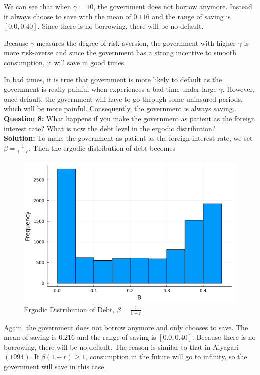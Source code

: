 \documentclass{article}
\begin{document}
	We can see that when $\gamma = 10$, the government does not borrow anymore. Instead it always choose to save with the mean of $0.116$ and the range of saving is $[0.0, 0.40]$. Since there is no borrowing, there will be no default.
	
	Because $\gamma$ measures the degree of risk aversion, the government with higher $\gamma$ is more risk-averse and since the government has a strong incentive to smooth consumption, it will save in good times.
	
	In bad times, it is true that government is more likely to default as the government is really painful when experiences a bad time under large $\gamma$. However, once default, the government will have to go through some uninsured periods, which will be more painful. Consequently, the government is always saving. \\
	
	\noindent\textbf{Question 8:} What happens if you make the government as patient as the foreign interest rate? What is now the debt level in the ergodic distribution? \\
	
	\noindent\textbf{Solution:} To make the government as patient as the foreign interest rate, we set $\beta = \frac{1}{1+r}$. Then the ergodic distribution of debt becomes
	
	\begin{figure}[htbp]
		\centering
		\includegraphics[scale=0.5]{B_histQ8.png}
		\caption{Ergodic Distribution of Debt, $\beta = \frac{1}{1+r}$}
	\end{figure}
	
	Again, the government does not borrow anymore and only chooses to save. The mean of saving is $0.216$ and the range of saving is $[0.0, 0.40]$. Because there is no borrowing, there will be no default. The reason is similar to that in Aiyagari $(1994)$. If $\beta(1+r) \ge 1$, consumption in the future will go to infinity, so the government will save in this case.
	
	
\end{document}

